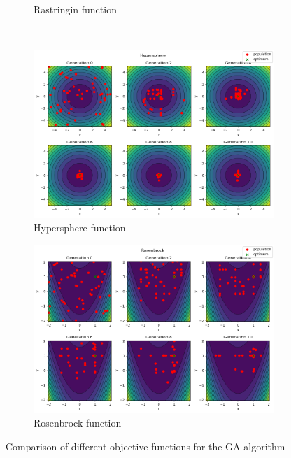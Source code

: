 \begin{figure}[H]
\begin{subfigure}{0.5\textwidth}
        \caption{Rastringin function}
    \end{subfigure}\\
    \begin{subfigure}{0.5\textwidth}
        \includegraphics[width=\textwidth]{lab7/imgs/ga_hypersphere.png}
        \caption{Hypersphere function}
    \end{subfigure}
    \begin{subfigure}{0.5\textwidth}
        \includegraphics[width=\textwidth]{lab7/imgs/ga_rosenbrock.png}
        \caption{Rosenbrock function}
    \end{subfigure}
    \caption{Comparison of different objective functions for the GA algorithm}
    \label{fig:ga-comp}
\end{figure}



